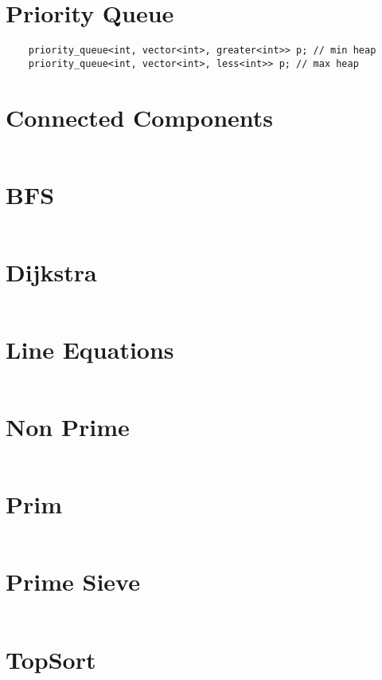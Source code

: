 \documentclass{article}
\begin{document}
\tableofcontents
\section{Priority Queue}
\begin{verbatim}
    priority_queue<int, vector<int>, greater<int>> p; // min heap
    priority_queue<int, vector<int>, less<int>> p; // max heap
\end{verbatim}
\section{Connected Components}
\inputminted[linenos,breaklines]{c++}{connected_component.cpp}

\section{BFS}
\inputminted[linenos,breaklines]{c++}{bfs.cpp}

\section{Dijkstra}
\inputminted[linenos,breaklines]{c++}{dijkstra.cpp}

\section{Line Equations}
\inputminted[linenos,breaklines]{c++}{lines_equation.cpp}

\section{Non Prime}
\inputminted[linenos,breaklines]{c++}{Nonprime.cpp}

\section{Prim}
\inputminted[linenos,breaklines]{c++}{prim.cpp}


\section{Prime Sieve}
\inputminted[linenos,breaklines]{c++}{prime_sieve.cpp}

\section{TopSort}
\inputminted[linenos,breaklines]{c++}{topsort.cpp}
\end{document}
